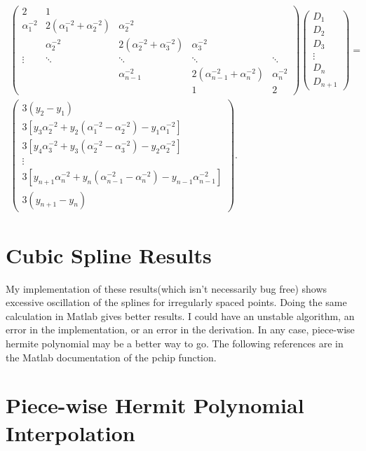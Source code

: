 \documentclass{scrartcl}
\begin{document}
\begin{align}
\left(\begin{array}{ccccc}
2&1\\
  \alpha_1^{-2}&2(\alpha_1^{-2}+\alpha_2^{-2})&\alpha_2^{-2}\\
 &\alpha_2^{-2}&2(\alpha_2^{-2}+\alpha_3^{-2})&\alpha_3^{-2}\\
\vdots&\ddots&\ddots&\ddots&\ddots\\
&&\alpha_{n-1}^{-2}&2(\alpha_{n-1}^{-2}+\alpha_n^{-2})&\alpha_n^{-2}\\
&&&1&2
\end{array}\right)
\left(\begin{array}{c}
D_1\\D_2\\D_3\\ \vdots\\D_n\\D_{n+1}
\end{array}\right) =\\
\left(\begin{array}{c}
3(y_2-y_1)\\
3[y_3\alpha_2^{-2}
	+y_2(\alpha_1^{-2}
	-\alpha_2^{-2})
	-y_1\alpha_1^{-2}]\\
3[y_4\alpha_3^{-2}
	+y_3(\alpha_2^{-2}
	-\alpha_3^{-2})
	-y_2\alpha_2^{-2}]\\
\vdots\\
3[y_{n+1}\alpha_n^{-2}+y_n(\alpha_{n-1}^{-2}
	-\alpha_n^{-2})-y_{n-1}\alpha_{n-1}^{-2}]\\
3(y_{n+1}-y_n)
\end{array}\right).\label{eq:eqtdi}
\end{align}

\section{Cubic Spline Results}
My implementation of these results(which isn't necessarily bug free)
shows excessive oscillation of the splines for irregularly spaced
points. Doing the same calculation in Matlab gives better results.
I could have an unstable algorithm, an error in the implementation,
or an error in the derivation. In any case, piece-wise hermite polynomial
may be a better way to go. The following references are in the Matlab
documentation of the pchip function\cite{Fritsch,Kahaner}.

\section{Piece-wise Hermit Polynomial Interpolation}
\end{document}
